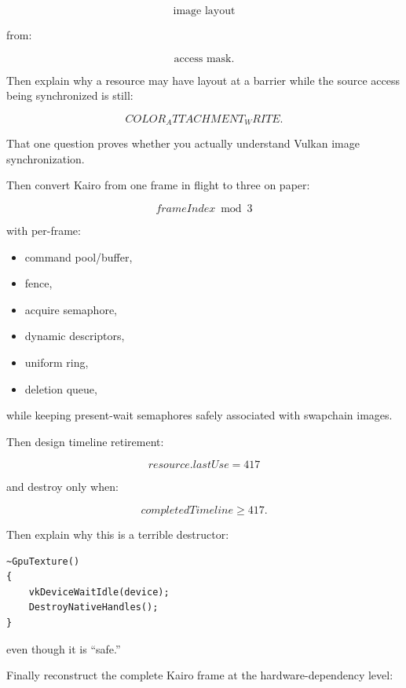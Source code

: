 \[
\text{image layout}
\]

from:

\[
\text{access mask}.
\]

Then explain why a resource may have layout  at a barrier while the source access being synchronized is still:

\[
COLOR_ATTACHMENT_WRITE.
\]

That one question proves whether you actually understand Vulkan image synchronization.

Then convert Kairo from one frame in flight to three on paper:

\[
frameIndex\bmod3
\]

with per-frame:

\begin{itemize}
\tightlist
\item
  command pool/buffer,
\item
  fence,
\item
  acquire semaphore,
\item
  dynamic descriptors,
\item
  uniform ring,
\item
  deletion queue,
\end{itemize}

while keeping present-wait semaphores safely associated with swapchain images.

Then design timeline retirement:

\[
resource.lastUse=417
\]

and destroy only when:

\[
completedTimeline\ge417.
\]

Then explain why this is a terrible destructor:

\begin{verbatim}
~GpuTexture()
{
    vkDeviceWaitIdle(device);
    DestroyNativeHandles();
}
\end{verbatim}

even though it is ``safe.''

Finally reconstruct the complete Kairo frame at the hardware-dependency level:

